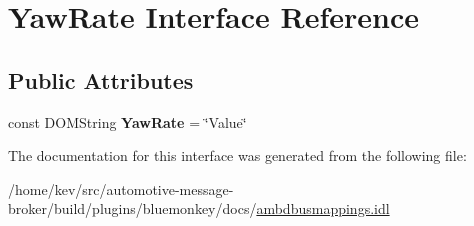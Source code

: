 \hypertarget{interfaceYawRate}{\section{Yaw\+Rate Interface Reference}
\label{interfaceYawRate}
}
\subsection*{Public Attributes}
\begin{DoxyCompactItemize}
\item 
\hypertarget{interfaceYawRate_a2ce33bd6e0077d22f8f3b137dacc80ad}{const D\+O\+M\+String {\bfseries Yaw\+Rate} = \char`\"{}Value\char`\"{}}\label{interfaceYawRate_a2ce33bd6e0077d22f8f3b137dacc80ad}

\end{DoxyCompactItemize}


The documentation for this interface was generated from the following file\+:\begin{DoxyCompactItemize}
\item 
/home/kev/src/automotive-\/message-\/broker/build/plugins/bluemonkey/docs/\hyperlink{ambdbusmappings_8idl}{ambdbusmappings.\+idl}\end{DoxyCompactItemize}
